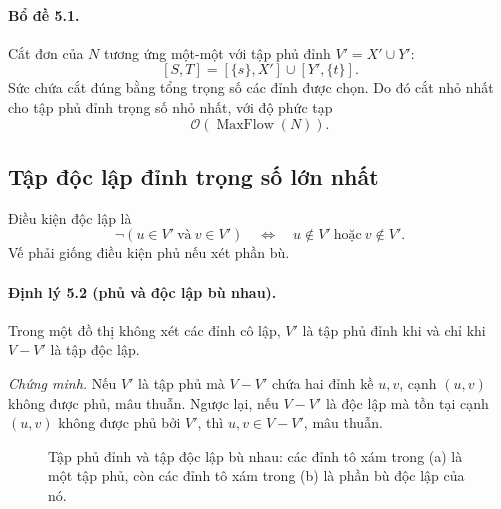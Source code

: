 \documentclass[11pt]{article}
\newcommand{\Oh}{\mathcal{O}}
\begin{document}
\paragraph{Bổ đề 5.1.}
Cắt đơn của \(N\) tương ứng một-một với tập phủ đỉnh \(V'=X'\cup Y'\):
\[
  [S,T]=[\{s\},X']\cup[Y',\{t\}].
\]
Sức chứa cắt đúng bằng tổng trọng số các đỉnh được chọn. Do đó cắt nhỏ nhất
cho tập phủ đỉnh trọng số nhỏ nhất, với độ phức tạp
\[
  \Oh(\operatorname{MaxFlow}(N)).
\]

\subsection{Tập độc lập đỉnh trọng số lớn nhất}

Điều kiện độc lập là
\[
  \neg(u\in V'\ \text{và}\ v\in V')
  \quad\Leftrightarrow\quad
  u\notin V'\ \text{hoặc}\ v\notin V'.
\]
Vế phải giống điều kiện phủ nếu xét phần bù.

\paragraph{Định lý 5.2 (phủ và độc lập bù nhau).}
Trong một đồ thị không xét các đỉnh cô lập, \(V'\) là tập phủ đỉnh khi và chỉ
khi \(V-V'\) là tập độc lập.

\emph{Chứng minh.}
Nếu \(V'\) là tập phủ mà \(V-V'\) chứa hai đỉnh kề \(u,v\), cạnh \((u,v)\)
không được phủ, mâu thuẫn. Ngược lại, nếu \(V-V'\) là độc lập mà tồn tại cạnh
\((u,v)\) không được phủ bởi \(V'\), thì \(u,v\in V-V'\), mâu thuẫn.

\begin{figure}[htbp]
\centering
{}
\caption{Tập phủ đỉnh và tập độc lập bù nhau: các đỉnh tô xám trong (a) là
một tập phủ, còn các đỉnh tô xám trong (b) là phần bù độc lập của nó.}
\end{figure}
\end{document}
